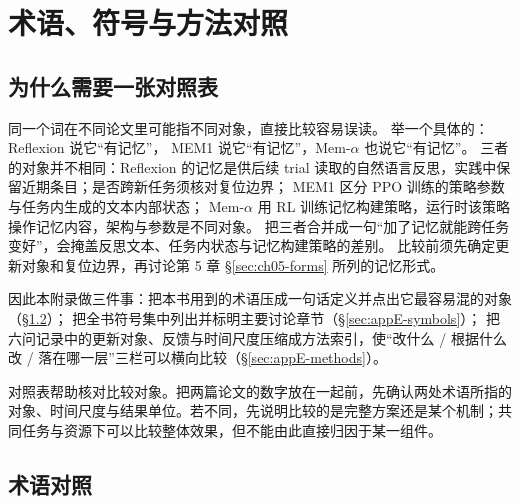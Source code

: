 \chapter{术语、符号与方法对照}
\label{app:crossref}

\section{为什么需要一张对照表}

\begin{failurebox}
同一个词在不同论文里可能指不同对象，直接比较容易误读。
举一个具体的：Reflexion 说它“有记忆”\cite{reflexion-2303}，
MEM1 说它“有记忆”\cite{mem1-2506}，Mem-$\alpha$ 也说它“有记忆”\cite{memalpha-2509}。
三者的对象并不相同：Reflexion 的记忆是供后续 trial 读取的自然语言反思，实践中保留近期条目；是否跨新任务须核对复位边界；
MEM1 区分 PPO 训练的策略参数与任务内生成的文本内部状态；
Mem-$\alpha$ 用 RL 训练记忆构建策略，运行时该策略操作记忆内容，架构与参数是不同对象。
把三者合并成一句“加了记忆就能跨任务变好”，会掩盖反思文本、任务内状态与记忆构建策略的差别。
比较前须先确定更新对象和复位边界，再讨论第 5 章 §\ref{sec:ch05-forms} 所列的记忆形式。
\end{failurebox}

\begin{sloppypar}
因此本附录做三件事：把本书用到的术语压成一句话定义并点出它最容易混的对象（§\ref{sec:appE-terms}）；
把全书符号集中列出并标明主要讨论章节（§\ref{sec:appE-symbols}）；
把六问记录中的更新对象、反馈与时间尺度压缩成方法索引，使“改什么 / 根据什么改 / 落在哪一层”三栏可以横向比较（§\ref{sec:appE-methods}）。
\end{sloppypar}

\begin{principlebox}
对照表帮助核对比较对象。把两篇论文的数字放在一起前，先确认两处术语所指的对象、时间尺度与结果单位。若不同，先说明比较的是完整方案还是某个机制；共同任务与资源下可以比较整体效果，但不能由此直接归因于某一组件。
\end{principlebox}

\section{术语对照}
\label{sec:appE-terms}

